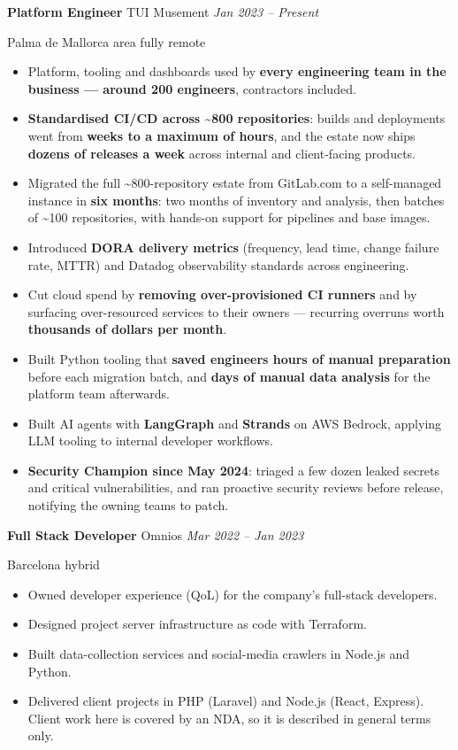 \documentclass[10pt,a4paper]{article}
\newcommand{\job}[3]{%
  \vspace{0.4em}%
  \noindent\textbf{#1} \textcolor{muted}{\textbar} #2 \hfill \textcolor{muted}{\small\textit{#3}}%
  \par\vspace{0.1em}%
}
\begin{document}
\job{Platform Engineer}{TUI Musement}{Jan 2023 -- Present}
\vspace{-0.15em}
\noindent\textcolor{muted}{\small Palma de Mallorca area \textbullet{} fully remote}\par\vspace{0.1em}
\begin{itemize}
  \item Platform, tooling and dashboards used by \textbf{every engineering team in the
  business --- around 200 engineers}, contractors included.
  \item \textbf{Standardised CI/CD across \textasciitilde800 repositories}: builds and
  deployments went from \textbf{weeks to a maximum of hours}, and the estate now ships
  \textbf{dozens of releases a week} across internal and client-facing products.
  \item Migrated the full \textasciitilde800-repository estate from GitLab.com to a
  self-managed instance in \textbf{six months}: two months of inventory and analysis, then
  batches of \textasciitilde100 repositories, with hands-on support for pipelines and base
  images.
  \item Introduced \textbf{DORA delivery metrics} (frequency, lead time, change failure rate,
  MTTR) and Datadog observability standards across engineering.
  \item Cut cloud spend by \textbf{removing over-provisioned CI runners} and by surfacing
  over-resourced services to their owners --- recurring overruns worth \textbf{thousands of
  dollars per month}.
  \item Built Python tooling that \textbf{saved engineers hours of manual preparation} before
  each migration batch, and \textbf{days of manual data analysis} for the platform team
  afterwards.
  \item Built AI agents with \textbf{LangGraph} and \textbf{Strands} on AWS Bedrock, applying
  LLM tooling to internal developer workflows.
  \item \textbf{Security Champion since May 2024}: triaged a few dozen leaked secrets and
  critical vulnerabilities, and ran proactive security reviews before release, notifying the
  owning teams to patch.
\end{itemize}

\job{Full Stack Developer}{Omnios}{Mar 2022 -- Jan 2023}
\vspace{-0.15em}
\noindent\textcolor{muted}{\small Barcelona \textbullet{} hybrid}\par\vspace{0.1em}
\begin{itemize}
  \item Owned developer experience (QoL) for the company's full-stack developers.
  \item Designed project server infrastructure as code with Terraform.
  \item Built data-collection services and social-media crawlers in Node.js and Python.
  \item Delivered client projects in PHP (Laravel) and Node.js (React, Express). Client work
  here is covered by an NDA, so it is described in general terms only.
\end{itemize}
\end{document}
